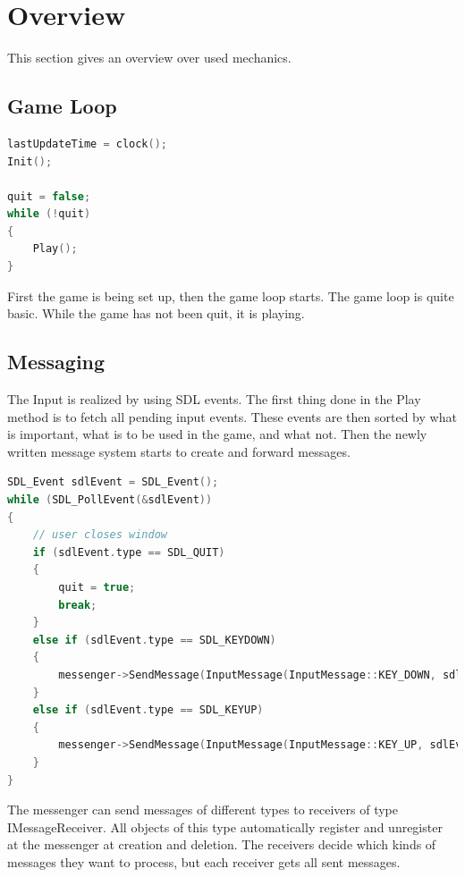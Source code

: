 \documentclass[12pt]{article}
\begin{document}
\section{Overview}
\label{section:overview}

This section gives an overview over used mechanics.

\subsection{Game Loop}

\begin{lstlisting}[caption=The game loop, language=C++]
lastUpdateTime = clock();
Init();

quit = false;
while (!quit)
{
	Play();
}
\end{lstlisting}

First the game is being set up, then the game loop starts. The game loop is quite basic. While the game has not been quit, it is playing.\newline

\subsection{Messaging}

The Input is realized by using SDL events. The first thing done in the Play method is to fetch all pending input events. These events are then sorted by what is important, what is to be used in the game, and what not. Then the newly written message system starts to create and forward messages.

\begin{lstlisting}[caption=Messaging, language=C++]
SDL_Event sdlEvent = SDL_Event();
while (SDL_PollEvent(&sdlEvent))
{
	// user closes window
	if (sdlEvent.type == SDL_QUIT)
	{
		quit = true;
		break;
	}
	else if (sdlEvent.type == SDL_KEYDOWN)
	{
		messenger->SendMessage(InputMessage(InputMessage::KEY_DOWN, sdlEvent.key.keysym.sym));
	}
	else if (sdlEvent.type == SDL_KEYUP)
	{
		messenger->SendMessage(InputMessage(InputMessage::KEY_UP, sdlEvent.key.keysym.sym));
	}
}
\end{lstlisting}

The messenger can send messages of different types to receivers of type IMessageReceiver. All objects of this type automatically register and unregister at the messenger at creation and deletion. The receivers decide which kinds of messages they want to process, but each receiver gets all sent messages.
\end{document}
